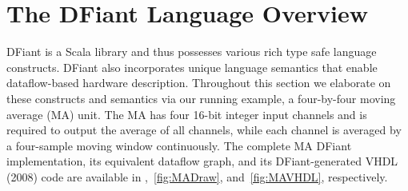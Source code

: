 \newpage
\section{The DFiant Language Overview}
\label{sec:dfiant}
DFiant is a Scala library and thus possesses various rich type safe language constructs. DFiant also incorporates unique language semantics that enable dataflow-based hardware description. Throughout this section we elaborate on these constructs and semantics via our running example, a four-by-four moving average (MA) unit. The MA has four 16-bit integer input channels and is required to output the average of all channels, while each channel is averaged by a four-sample moving window continuously. The complete MA DFiant implementation, its equivalent dataflow graph, and its DFiant-generated VHDL (2008) code are available in ,~\ref{fig:MADraw}, and~\ref{fig:MAVHDL}, respectively.


